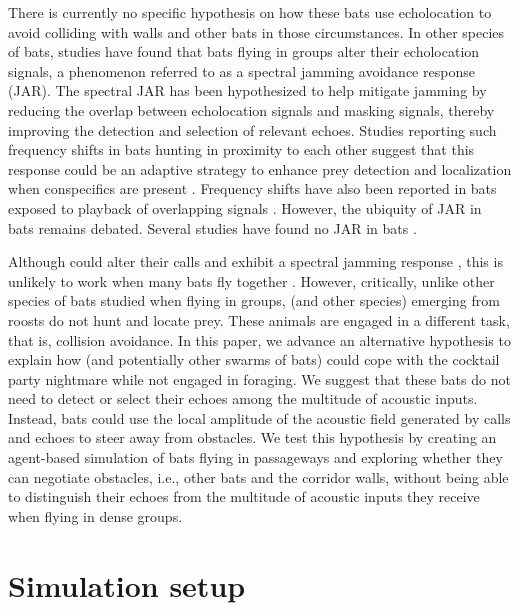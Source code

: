\documentclass[a4paper, 11pt]{article}
\begin{document}
There is currently no specific hypothesis on how these bats use echolocation to avoid colliding with walls and other bats in those circumstances. In other species of bats, studies have found that bats flying in groups alter their echolocation signals, a phenomenon referred to as a spectral jamming avoidance response (JAR). The spectral JAR has been hypothesized to help mitigate jamming by reducing the overlap between echolocation signals and masking signals, thereby improving the detection and selection of relevant echoes. Studies reporting such frequency shifts in bats hunting in proximity to each other suggest that this response could be an adaptive strategy to enhance prey detection and localization when conspecifics are present \citep[for example,][]{Ulanovsky2004,Takahashi2014, Ibanez2004}. Frequency shifts have also been reported in bats exposed to playback of overlapping signals \citep{Mazar2020,Beetz2021}. However, the ubiquity of JAR in bats remains debated. Several studies have found no JAR in bats \cite{Amichai2015,Goetze2016,Cvikel2015,Pedersen2022}.

Although  could alter their calls and exhibit a spectral jamming response \citep{Gillam2007,Eveland2023}, this is unlikely to work when many bats fly together \citep[][See Discussion for more details]{Ulanovsky2008}. However, critically, unlike other species of bats studied when flying in groups,  (and other species) emerging from roosts do not hunt and locate prey. These animals are engaged in a different task, that is, collision avoidance. In this paper, we advance an alternative hypothesis to explain how  (and potentially other swarms of bats) could cope with the cocktail party nightmare while not engaged in foraging. We suggest that these bats do not need to detect or select their echoes among the multitude of acoustic inputs. Instead, bats could use the local amplitude of the acoustic field generated by calls and echoes to steer away from obstacles. We test this hypothesis by creating an agent-based simulation of bats flying in passageways and exploring whether they can negotiate obstacles, i.e., other bats and the corridor walls, without being able to distinguish their echoes from the multitude of acoustic inputs they receive when flying in dense groups.

\section{Simulation setup}
\end{document}
